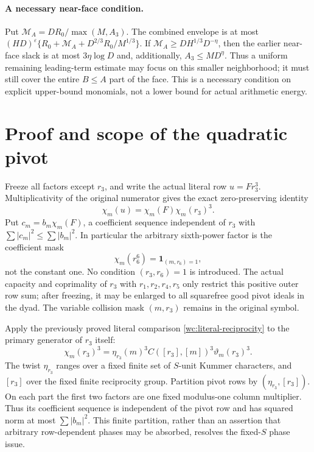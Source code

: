 \documentclass[11pt]{article}
\theoremstyle{definition}\newtheorem{definition}[theorem]{Definition}
\theoremstyle{remark}\newtheorem{remark}[theorem]{Remark}
\begin{document}
\paragraph{A necessary near-face condition.}\label{qp:near}
Put $\mathcal M_A=DR_0/\max(M,A_3)$.
The combined envelope is at most
$(HD)^\varepsilon\{R_0+\mathcal M_A+D^{2/3}R_0/M^{1/3}\}$.
If $\mathcal M_A\ge DH^{1/3}D^{-\eta}$, then the earlier
near-face slack is at most $3\eta\log D$ and, additionally,
$A_3\le M D^\eta$. Thus a uniform remaining leading-term estimate
may focus on this smaller neighborhood; it must still cover the entire
$B\le A$ part of the face. This is a necessary condition on explicit
upper-bound monomials, not a lower bound for actual arithmetic energy.

\section{Proof and scope of the quadratic pivot}\label{qp:details}
Freeze all factors except $r_3$, and write the actual literal row
$u=Fr_3^3$. Multiplicativity of the original numerator gives the exact
zero-preserving identity
\[
 \chi_m(u)=\chi_m(F)\chi_m(r_3)^3.
\]
Put $c_m=b_m\chi_m(F)$, a coefficient sequence independent of $r_3$ with
$\sum|c_m|^2\le\sum|b_m|^2$. In particular the arbitrary sixth-power
factor is the coefficient mask
\[
 \chi_m(r_6^6)=\mathbf1_{(m,r_6)=1},
\]
not the constant one. No condition $(r_3,r_6)=1$ is introduced.
The actual capacity and coprimality of $r_3$ with
$r_1,r_2,r_4,r_5$ only restrict this positive outer row sum; after freezing,
it may be enlarged to all squarefree good pivot ideals in the dyad.
The variable collision mask $(m,r_3)$ remains in the original symbol.

Apply the previously proved literal comparison
\eqref{wc:literal-reciprocity} to the primary generator of $r_3$ itself:
\[
 \chi_m(r_3)^3=
 \eta_{r_3}(m)^3 C([r_3],[m])^3\vartheta_m(r_3)^3.
\]
The twist $\eta_{r_3}$ ranges over a fixed finite set of $S$-unit Kummer
characters, and $[r_3]$ over the fixed finite reciprocity group.
Partition pivot rows by $(\eta_{r_3},[r_3])$. On each part the first two
factors are one fixed modulus-one column multiplier. Thus its coefficient
sequence is independent of the pivot row and has squared norm at most
$\sum|b_m|^2$. This finite partition, rather than an assertion that arbitrary
row-dependent phases may be absorbed, resolves the fixed-$S$ phase issue.
\end{document}
